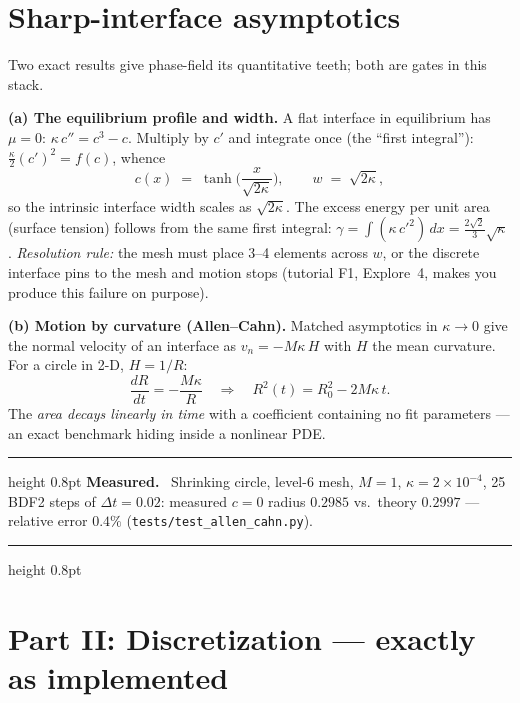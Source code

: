\documentclass[11pt]{article}
\newenvironment{measured}{%
  \par\medskip\noindent\begin{minipage}{\linewidth}
  \hrule height 0.8pt \smallskip
  \textbf{Measured.}\ }{%
  \smallskip\hrule height 0.8pt \end{minipage}\par\medskip}
\begin{document}
\section{Sharp-interface asymptotics}
\label{sec:sharp}

Two exact results give phase-field its quantitative teeth; both are
gates in this stack.

\textbf{(a) The equilibrium profile and width.} A flat interface in
equilibrium has $\mu = 0$: $\kappa\, c'' = c^3 - c$. Multiply by $c'$
and integrate once (the ``first integral''):
$\tfrac{\kappa}{2}(c')^2 = f(c)$, whence
\begin{equation}
  c(x) \;=\; \tanh\!\Big( \frac{x}{\sqrt{2\kappa}} \Big),
  \qquad
  w \;=\; \sqrt{2\kappa},
  \label{eq:tanh}
\end{equation}
so the intrinsic interface width scales as $\sqrt{2\kappa}$. The excess
energy per unit area (surface tension) follows from the same first
integral: $\gamma = \int (\kappa\, c'^2)\,dx =
\frac{2\sqrt{2}}{3}\sqrt{\kappa}$.
\emph{Resolution rule:} the mesh must place 3--4 elements across $w$,
or the discrete interface pins to the mesh and motion stops (tutorial
F1, Explore~4, makes you produce this failure on purpose).

\textbf{(b) Motion by curvature (Allen--Cahn).} Matched asymptotics in
$\kappa \to 0$ give the normal velocity of an interface as
$v_n = -M\kappa\, H$ with $H$ the mean curvature. For a circle in 2-D,
$H = 1/R$:
\begin{equation}
  \frac{dR}{dt} = -\frac{M\kappa}{R}
  \quad\Longrightarrow\quad
  R^2(t) = R_0^2 - 2M\kappa\, t .
  \label{eq:circle}
\end{equation}
The \emph{area decays linearly in time} with a coefficient containing
no fit parameters --- an exact benchmark hiding inside a nonlinear PDE.

\begin{measured}
Shrinking circle, level-6 mesh, $M{=}1$, $\kappa{=}2\times 10^{-4}$,
25 BDF2 steps of $\Delta t = 0.02$: measured $c{=}0$ radius $0.2985$
vs.\ theory $0.2997$ --- relative error $0.4\%$
(\texttt{tests/test\_allen\_cahn.py}).
\end{measured}

\section*{Part II: Discretization --- exactly as implemented}
\end{document}
